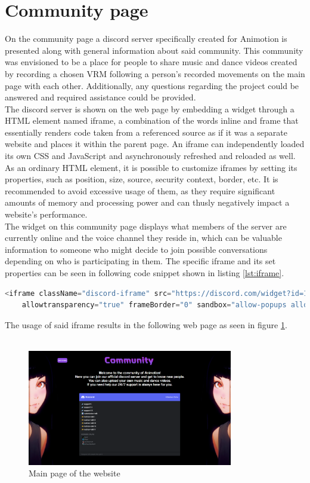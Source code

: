\section{Community page}
On the community page a discord server specifically created for Animotion is presented along with
general information about said community. This community was envisioned to be a place for people
to share music and dance videos created by recording a chosen VRM following a person's recorded
movements on the main page with each other. Additionally, any questions regarding the project could
be answered and required assistance could be provided. \\
The discord server is shown on the web page by embedding a widget through a HTML element named
iframe, a combination of the words inline and frame that essentially renders code taken from a
referenced source as if it was a separate website and places it within the parent page. An iframe
can independently loaded its own CSS and JavaScript and asynchronously refreshed and reloaded as
well. As an ordinary HTML element, it is possible to customize iframes by setting its properties,
such as position, size, source, security context, border, etc. It is recommended to avoid excessive
usage of them, as they require significant amounts of memory and processing power and can thusly
negatively impact a website's performance. \\ %
The widget on this community page displays what members of the server are currently online and the
voice channel they reside in, which can be valuable information to someone who might decide to join
possible conversations depending on who is participating in them.
The specific iframe and its set properties can be seen in following code snippet shown in listing \ref{lst:iframe}.
\begin{lstlisting}[language=Python,caption=iframe used for discord widget,label=lst:iframe]
    <iframe className="discord-iframe" src="https://discord.com/widget?id=1035647726634934382&theme=dark"
    allowtransparency="true" frameBorder="0" sandbox="allow-popups allow-popups-to-escape-sandbox allow-same-origin allow-scripts"></iframe>
\end{lstlisting}
The usage of said iframe results in the following web page as seen in figure \ref{fig:communitypage}.
\\
\\
\begin{figure}[htb]
    \centering
    \includegraphics[width=0.8\textwidth]{pics/Animotion_community.png}
    \caption{Main page of the website}
    \label{fig:communitypage}
\end{figure}
